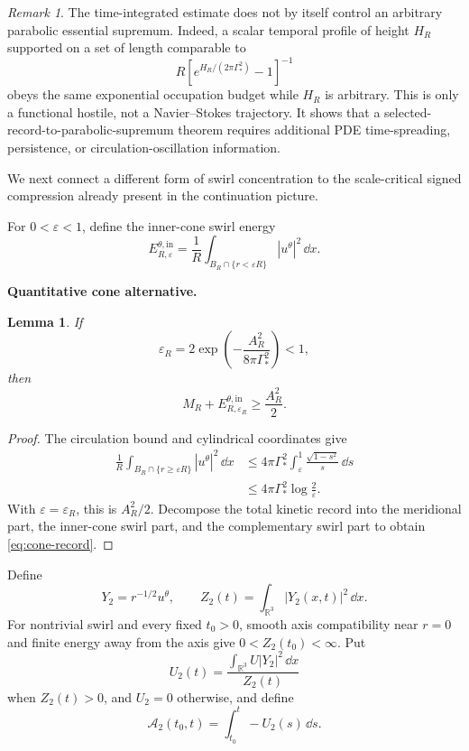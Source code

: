 \documentclass[11pt]{article}
\newtheorem{lemma}[theorem]{Lemma}
\theoremstyle{definition}\newtheorem{definition}[theorem]{Definition}
\theoremstyle{remark}\newtheorem{remark}[theorem]{Remark}
\begin{document}
\begin{remark}
The time-integrated estimate does not by itself control an arbitrary
parabolic essential supremum.  Indeed, a scalar temporal profile of height
\(H_R\) supported on a set of length comparable to
\[
 R\left[e^{H_R/(2\pi\Gamma_*^2)}-1\right]^{-1}
\]
obeys the same exponential occupation budget while \(H_R\) is arbitrary.
This is only a functional hostile, not a Navier--Stokes trajectory.  It shows
that a selected-record-to-parabolic-supremum theorem requires additional PDE
time-spreading, persistence, or circulation-oscillation information.
\end{remark}

We next connect a different form of swirl concentration to the
scale-critical signed compression already present in the continuation
picture.

For \(0<\varepsilon<1\), define the inner-cone swirl energy
\[
 E_{R,\varepsilon}^{\theta,\mathrm{in}}
 =
 \frac1R
 \int_{B_R\cap\{r<\varepsilon R\}}|u^\theta|^2\,\dd x.
\]

\medskip
\noindent\textbf{Quantitative cone alternative.}
\begin{lemma}\label{lem:swirl-cone}
If
\[
 \varepsilon_R
 =
 2\exp\!\left(
 -\frac{A_R^2}{8\pi\Gamma_*^2}
 \right)<1,
\]
then
\begin{equation}\label{eq:cone-record}
 \boxed{
 M_R+E_{R,\varepsilon_R}^{\theta,\mathrm{in}}
 \ge\frac{A_R^2}{2}.
 }
\end{equation}
\end{lemma}

\begin{proof}
The circulation bound and cylindrical coordinates give
\[
 \begin{aligned}
 \frac1R
 \int_{B_R\cap\{r\ge\varepsilon R\}}|u^\theta|^2\,\dd x
 &\le
 4\pi\Gamma_*^2
 \int_\varepsilon^1\frac{\sqrt{1-s^2}}{s}\,\dd s\\
 &\le4\pi\Gamma_*^2\log\frac2\varepsilon.
 \end{aligned}
\]
With \(\varepsilon=\varepsilon_R\), this is \(A_R^2/2\).  Decompose the
total kinetic record into the meridional part, the inner-cone swirl part, and
the complementary swirl part to obtain \eqref{eq:cone-record}.
\end{proof}

Define
\[
 Y_2=r^{-1/2}u^\theta,
 \qquad
 Z_2(t)=\int_{\mathbb R^3}|Y_2(x,t)|^2\,\dd x.
\]
For nontrivial swirl and every fixed \(t_0>0\), smooth axis compatibility near
\(r=0\) and finite energy away from the axis give
\(0<Z_2(t_0)<\infty\).  Put
\[
 U_2(t)
 =
 \frac{\int_{\mathbb R^3}U|Y_2|^2\,\dd x}{Z_2(t)}
\]
when \(Z_2(t)>0\), and \(U_2=0\) otherwise, and define
\[
 \mathcal A_2(t_0,t)=\int_{t_0}^t -U_2(s)\,\dd s.
\]
\end{document}
